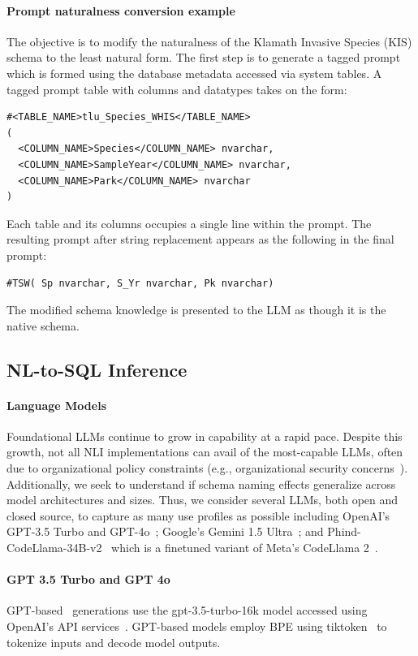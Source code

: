 \paragraph{Prompt naturalness conversion example}
The objective is to modify the naturalness of the Klamath Invasive Species (KIS) schema to the least natural form.
The first step is to generate a tagged prompt which is formed using the database metadata accessed via system tables.
A tagged prompt table with columns and datatypes takes on the form:
\begin{verbatim}
#<TABLE_NAME>tlu_Species_WHIS</TABLE_NAME>
( 
  <COLUMN_NAME>Species</COLUMN_NAME> nvarchar, 
  <COLUMN_NAME>SampleYear</COLUMN_NAME> nvarchar, 
  <COLUMN_NAME>Park</COLUMN_NAME> nvarchar
)
\end{verbatim}
Each table and its columns occupies a single line within the prompt.
The resulting prompt after string replacement appears as the following in the final prompt:
\begin{verbatim}
#TSW( Sp nvarchar, S_Yr nvarchar, Pk nvarchar)
\end{verbatim}

The modified schema knowledge is presented to the LLM as though it is the native schema.


\subsection{NL-to-SQL Inference}

\paragraph{\textbf{Language Models}}
Foundational LLMs continue to grow in capability at a rapid pace.
Despite this growth, not all NLI implementations can avail of the most-capable LLMs, often due to organizational policy constraints (e.g., organizational security concerns~\cite{gsa-llm-directive}).
Additionally, we seek to understand if schema naming effects generalize across model architectures and sizes.
Thus, we consider several LLMs, both open and closed source, to capture as many use profiles as possible including OpenAI's GPT-3.5 Turbo and GPT-4o~\cite{openai-chatgpt-blog-post, openai-api-documentation}; Google's Gemini 1.5 Ultra~\cite{geminiteam2024gemini, geminiteam2024gemini15}; and Phind-CodeLlama-34B-v2~\cite{phind2022phindcodellama} which is a finetuned variant of Meta's CodeLlama 2~\cite{roziere2023code}.

\paragraph{GPT 3.5 Turbo and GPT 4o}
GPT-based~\cite{openai-chatgpt-blog-post} generations use the gpt-3.5-turbo-16k model accessed using OpenAI's API services~\cite{openai-api-documentation}. 
GPT-based models employ BPE using tiktoken~\cite{openai-tokenizer} to tokenize inputs and decode model outputs.

